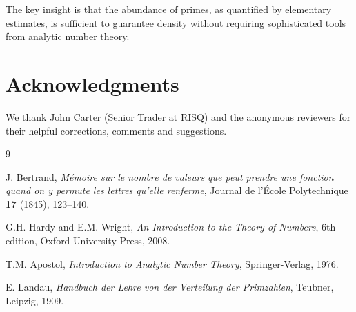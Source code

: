 \documentclass[11pt]{article}
\begin{document}
The key insight is that the abundance of primes, as quantified by elementary estimates, is sufficient to guarantee density without requiring sophisticated tools from analytic number theory.

\section*{Acknowledgments}

We thank John Carter (Senior Trader at RISQ) and the anonymous reviewers for their helpful corrections, comments and suggestions.

\begin{thebibliography}{9}

J. Bertrand, \emph{M\'emoire sur le nombre de valeurs que peut prendre une fonction quand on y permute les lettres qu'elle renferme}, Journal de l'\'Ecole Polytechnique \textbf{17} (1845), 123--140.

G.H. Hardy and E.M. Wright, \emph{An Introduction to the Theory of Numbers}, 6th edition, Oxford University Press, 2008.

T.M. Apostol, \emph{Introduction to Analytic Number Theory}, Springer-Verlag, 1976.

E. Landau, \emph{Handbuch der Lehre von der Verteilung der Primzahlen}, Teubner, Leipzig, 1909.

\end{thebibliography}
\end{document}
